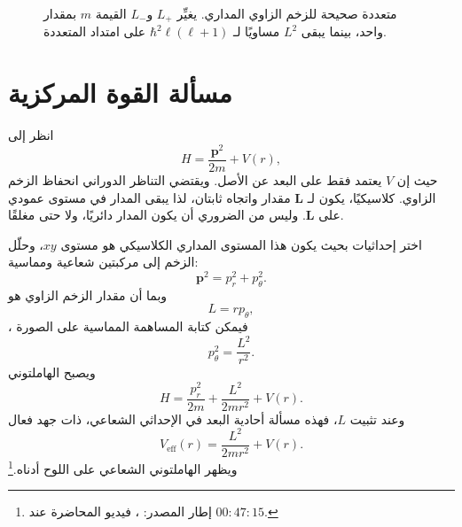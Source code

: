 \begin{figure}[htbp]\centering
{}\caption{متعددة صحيحة للزخم الزاوي المداري. يغيِّر \(L_+\) و\(L_-\) القيمة \(m\) بمقدار واحد، بينما يبقى \(L^2\) مساويًا لـ \(\hbar^2\ell(\ell+1)\) على امتداد المتعددة.}\end{figure}

\section{مسألة القوة المركزية}

انظر إلى \begin{equation}
H=\frac{\mathbf p^2}{2m}+V(r),
\end{equation} حيث إن \(V\) يعتمد فقط على البعد عن الأصل. ويقتضي التناظر الدوراني انحفاظ الزخم الزاوي. كلاسيكيًا، يكون لـ \(\mathbf L\) مقدار واتجاه ثابتان، لذا يبقى المدار في مستوى عمودي على \(\mathbf L\). وليس من الضروري أن يكون المدار دائريًا، ولا حتى مغلقًا.

اختر إحداثيات بحيث يكون هذا المستوى المداري الكلاسيكي هو مستوى \(xy\)، وحلّل الزخم إلى مركبتين شعاعية ومماسية: \begin{equation}
\mathbf p^2=p_r^2+p_\theta^2.
\end{equation} وبما أن مقدار الزخم الزاوي هو \begin{equation}
L=r p_\theta,
\end{equation}، فيمكن كتابة المساهمة المماسية على الصورة \begin{equation}
p_\theta^2=\frac{L^2}{r^2}.
\end{equation} ويصبح الهاملتوني \begin{equation}
H=\frac{p_r^2}{2m}+\frac{L^2}{2mr^2}+V(r).
\end{equation} وعند تثبيت \(L\)، فهذه مسألة أحادية البعد في الإحداثي الشعاعي، ذات جهد فعال \begin{equation}
V_{\mathrm{eff}}(r)=\frac{L^2}{2mr^2}+V(r).
\end{equation} ويظهر الهاملتوني الشعاعي على اللوح أدناه.\footnote{إطار المصدر: \texttt{}، فيديو المحاضرة عند \(00{:}47{:}15\).}

